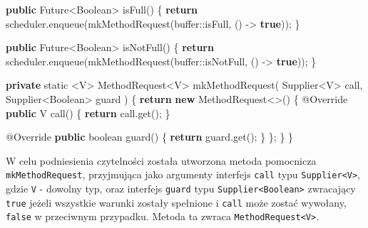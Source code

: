 \documentclass[11pt]{article}
\newenvironment{Shaded}{}{}
\newcommand{\KeywordTok}[1]{\textcolor[rgb]{0.00,0.44,0.13}{\textbf{{#1}}}}
\newcommand{\DataTypeTok}[1]{\textcolor[rgb]{0.56,0.13,0.00}{{#1}}}
\newcommand{\FunctionTok}[1]{\textcolor[rgb]{0.02,0.16,0.49}{{#1}}}
\newcommand{\NormalTok}[1]{{#1}}
\newcommand{\ControlFlowTok}[1]{\textcolor[rgb]{0.00,0.44,0.13}{\textbf{{#1}}}}
\newcommand{\OperatorTok}[1]{\textcolor[rgb]{0.40,0.40,0.40}{{#1}}}
\newcommand{\BuiltInTok}[1]{{#1}}
\newcommand{\AttributeTok}[1]{\textcolor[rgb]{0.49,0.56,0.16}{{#1}}}
\begin{document}
\begin{Shaded}
\begin{Highlighting}[]
    \KeywordTok{public} \BuiltInTok{Future}\OperatorTok{\textless{}}\BuiltInTok{Boolean}\OperatorTok{\textgreater{}} \FunctionTok{isFull}\OperatorTok{()} \OperatorTok{\{}
        \ControlFlowTok{return}\NormalTok{ scheduler}\OperatorTok{.}\FunctionTok{enqueue}\OperatorTok{(}\FunctionTok{mkMethodRequest}\OperatorTok{(}\NormalTok{buffer}\OperatorTok{::}\NormalTok{isFull}\OperatorTok{,} \OperatorTok{()} \OperatorTok{{-}\textgreater{}} \KeywordTok{true}\OperatorTok{));}
    \OperatorTok{\}}

    \KeywordTok{public} \BuiltInTok{Future}\OperatorTok{\textless{}}\BuiltInTok{Boolean}\OperatorTok{\textgreater{}} \FunctionTok{isNotFull}\OperatorTok{()} \OperatorTok{\{}
        \ControlFlowTok{return}\NormalTok{ scheduler}\OperatorTok{.}\FunctionTok{enqueue}\OperatorTok{(}\FunctionTok{mkMethodRequest}\OperatorTok{(}\NormalTok{buffer}\OperatorTok{::}\NormalTok{isNotFull}\OperatorTok{,} \OperatorTok{()} \OperatorTok{{-}\textgreater{}} \KeywordTok{true}\OperatorTok{));}
    \OperatorTok{\}}

    \KeywordTok{private} \DataTypeTok{static} \OperatorTok{\textless{}}\NormalTok{V}\OperatorTok{\textgreater{}}\NormalTok{ MethodRequest}\OperatorTok{\textless{}}\NormalTok{V}\OperatorTok{\textgreater{}} \FunctionTok{mkMethodRequest}\OperatorTok{(}
\NormalTok{        Supplier}\OperatorTok{\textless{}}\NormalTok{V}\OperatorTok{\textgreater{}}\NormalTok{ call}\OperatorTok{,}
\NormalTok{        Supplier}\OperatorTok{\textless{}}\BuiltInTok{Boolean}\OperatorTok{\textgreater{}}\NormalTok{ guard}
    \OperatorTok{)} \OperatorTok{\{}
        \ControlFlowTok{return} \KeywordTok{new}\NormalTok{ MethodRequest}\OperatorTok{\textless{}\textgreater{}()} \OperatorTok{\{}
            \AttributeTok{@Override}
            \KeywordTok{public}\NormalTok{ V }\FunctionTok{call}\OperatorTok{()} \OperatorTok{\{}
                \ControlFlowTok{return}\NormalTok{ call}\OperatorTok{.}\FunctionTok{get}\OperatorTok{();}
            \OperatorTok{\}}

            \AttributeTok{@Override}
            \KeywordTok{public} \DataTypeTok{boolean} \FunctionTok{guard}\OperatorTok{()} \OperatorTok{\{}
                \ControlFlowTok{return}\NormalTok{ guard}\OperatorTok{.}\FunctionTok{get}\OperatorTok{();}
            \OperatorTok{\}}
        \OperatorTok{\};}
    \OperatorTok{\}}
\OperatorTok{\}}
\end{Highlighting}
\end{Shaded}

W celu podniesienia czytelności została utworzona metoda pomocnicza
\texttt{mkMethodRequest}, przyjmująca jako argumenty interfejs
\texttt{call} typu \texttt{Supplier\textless{}V\textgreater{}}, gdzie
\texttt{V} - dowolny typ, oraz interfejs \texttt{guard} typu
\texttt{Supplier\textless{}Boolean\textgreater{}} zwracający
\texttt{true} jeżeli wszystkie warunki zostały spełnione i \texttt{call}
może zostać wywołany, \texttt{false} w przeciwnym przypadku. Metoda ta
zwraca \texttt{MethodRequest\textless{}V\textgreater{}}.
\end{document}
